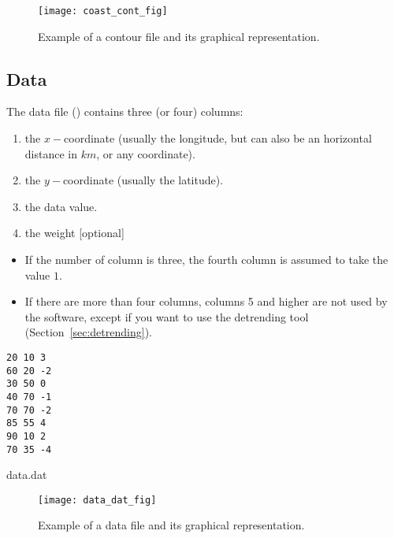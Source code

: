 \begin{figure}[H]
\centering 
\texttt{[image: coast\_cont\_fig]}
\caption{Example of a contour file and its graphical representation.}
\end{figure}

\subsection{Data\label{sec:dataformat}}

The data file () contains three (or four) columns: 
\begin{enumerate}
\item the $x-$coordinate (usually the longitude, but can also be an horizontal distance in $km$, or any coordinate).
\item the $y-$coordinate (usually the latitude).
\item the data value.
\item the weight [optional] 
\end{enumerate}
\begin{itemize}
\item If the number of column is three, the fourth column is assumed to take the value $1$. 
\item If there are more than four columns, columns 5 and higher are not used by the software, except if you want to use the detrending tool (Section~\ref{sec:detrending}). 
\end{itemize}

\begin{exfile}[htpb]
\begin{footnotesize}
\texttt{20 10 3\\
60 20 -2\\
30 50 0\\
40 70 -1\\
70 70 -2\\
85 55 4\\
90 10 2\\
70 35 -4} 
\end{footnotesize}
\caption{data.dat\label{ex:data.dat}}
\end{exfile}


\begin{figure}[H]
\centering
\texttt{[image: data\_dat\_fig]}
\caption{Example of a data file and its graphical representation.}
\end{figure}




